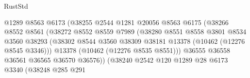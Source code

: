 \begin{lexlean}{RustStd}
\begin{coremodule}
                                          @1289
                                          @8563
                                          @6173
                                          (@38255
                                            @2544
                                            @1281
                                            @20056
                                            @8563
                                            @6175
                                            (@38266
                                              @8552
                                              @8561
                                              (@38272
                                                @8552
                                                @8559
                                                @7989
                                                (@38280
                                                  @8551
                                                  @8558
                                                  @3801
                                                  @8534
                                                  @3560
                                                  @38293
                                                  (@38302
                                                    @8544
                                                    @3560
                                                    @38309
                                                    @38181
                                                    @13378
                                                    (@10462 (@12276 @8545 @3346)))
                                                  @13378
                                                  (@10462 (@12276 @8535 @8551)))
                                                @36555
                                                @36558
                                                @36561
                                                @36565
                                                @36570
                                                @36576))
                                            (@38240
                                              @2542
                                              @120
                                              @1289
                                              @28
                                              @6173
                                              @3340
                                              (@38248
                                                @285
                                                @291

\end{coremodule}
\end{lexlean}
